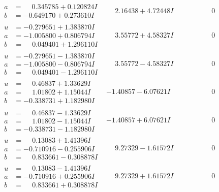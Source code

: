 \documentclass[1p]{elsarticle_modified}
\theoremstyle{definition}
\begin{document}
$$\begin{array}{c|c|c}
\begin{aligned}
a &= \phantom{-}0.345785 + 0.120824 I \\
b &= -0.649170 + 0.273610 I\end{aligned}
 & \phantom{-}2.16438 + 4.72448 I & \phantom{-0.000000 } 0 \\ \hline\begin{aligned}
u &= -0.279651 + 1.383870 I \\
a &= -1.005800 + 0.806794 I \\
b &= \phantom{-}0.049401 + 1.296110 I\end{aligned}
 & \phantom{-}3.55772 + 4.58327 I & \phantom{-0.000000 } 0 \\ \hline\begin{aligned}
u &= -0.279651 - 1.383870 I \\
a &= -1.005800 - 0.806794 I \\
b &= \phantom{-}0.049401 - 1.296110 I\end{aligned}
 & \phantom{-}3.55772 - 4.58327 I & \phantom{-0.000000 } 0 \\ \hline\begin{aligned}
u &= \phantom{-}0.46837 + 1.33629 I \\
a &= \phantom{-}1.01802 + 1.15044 I \\
b &= -0.338731 + 1.182980 I\end{aligned}
 & -1.40857 - 6.07621 I & \phantom{-0.000000 } 0 \\ \hline\begin{aligned}
u &= \phantom{-}0.46837 - 1.33629 I \\
a &= \phantom{-}1.01802 - 1.15044 I \\
b &= -0.338731 - 1.182980 I\end{aligned}
 & -1.40857 + 6.07621 I & \phantom{-0.000000 } 0 \\ \hline\begin{aligned}
u &= \phantom{-}0.13083 + 1.41396 I \\
a &= -0.710916 - 0.255906 I \\
b &= \phantom{-}0.833661 - 0.308878 I\end{aligned}
 & \phantom{-}9.27329 - 1.61572 I & \phantom{-0.000000 } 0 \\ \hline\begin{aligned}
u &= \phantom{-}0.13083 - 1.41396 I \\
a &= -0.710916 + 0.255906 I \\
b &= \phantom{-}0.833661 + 0.308878 I\end{aligned}
 & \phantom{-}9.27329 + 1.61572 I & \phantom{-0.000000 } 0 \\ \hline\begin{aligned}

\end{aligned}
\end{array}$$
\end{document}
